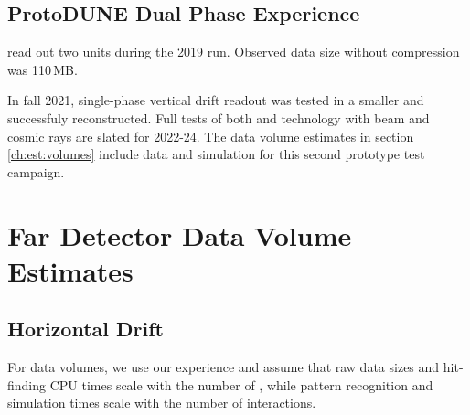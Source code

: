 \documentclass[../main-v1.tex]{subfiles}
\begin{document}
\subsection{ProtoDUNE Dual Phase Experience}
 read out two  units during the 2019 run.  Observed data size without compression  was 110\,MB.  %

In fall 2021, single-phase vertical drift readout was tested in a smaller  and successfuly reconstructed. Full  tests of both  and  technology with beam and cosmic rays are slated for 2022-24. The data volume estimates in section \ref{ch:est:volumes} include data and simulation for this second prototype test campaign. 







\section{Far Detector Data Volume Estimates }
\label{sec:est:FD}  

\subsection{Horizontal Drift}
For   data volumes, we use our  experience and assume that raw data sizes and hit-finding CPU times scale with the number of , while pattern recognition and simulation times scale with the number of interactions. 
\end{document}
